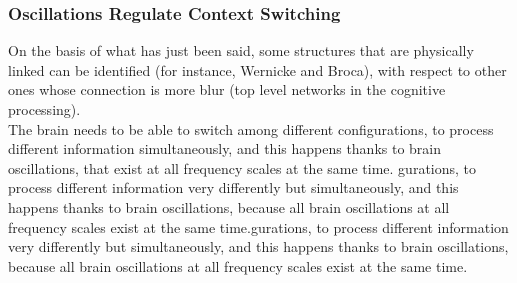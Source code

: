 \subsubsection{Oscillations Regulate Context Switching}
On the basis of what has just been said, some structures that are physically linked can be identified (for instance, Wernicke and Broca), with respect to other ones whose connection is more blur (top level networks in the 
cognitive processing). \\
The brain needs to be able to switch 
among different configurations, to process different information simultaneously, and this happens thanks to brain oscillations, that exist at all frequency scales at the same time. gurations, to process different information very differently but simultaneously, and this happens thanks to brain oscillations, because all brain 
oscillations at all frequency scales exist at the same time.gurations, to process different information very differently but simultaneously, and this happens thanks to brain oscillations, because all brain 
oscillations at all frequency scales exist at the same time.